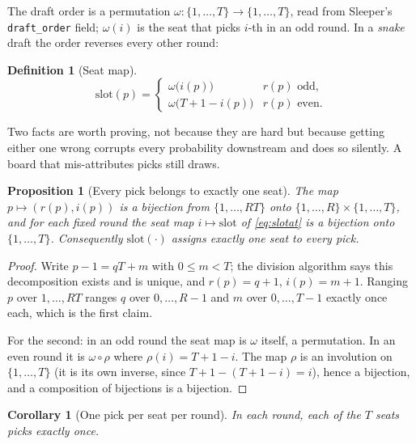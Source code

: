 \documentclass[10pt,a4paper]{article}
\theoremstyle{plain}
\newtheorem{proposition}[theorem]{Proposition}
\newtheorem{corollary}[theorem]{Corollary}
\theoremstyle{definition}
\newtheorem{definition}[theorem]{Definition}
\theoremstyle{remark}
\newcommand{\code}[1]{\texttt{\small #1}}
\begin{document}
The draft order is a permutation $\omega : \{1,\dots,T\} \to \{1,\dots,T\}$, read from
Sleeper's \code{draft\_order} field; $\omega(i)$ is the seat that picks $i$-th in an odd
round. In a \emph{snake} draft the order reverses every other round:

\begin{definition}[Seat map]
\begin{equation}
\mathrm{slot}(p) =
\begin{cases}
\omega\big(i(p)\big)      & r(p) \text{ odd},\\[0.2em]
\omega\big(T + 1 - i(p)\big) & r(p) \text{ even}.
\end{cases}
\label{eq:slotat}
\end{equation}
\end{definition}

Two facts are worth proving, not because they are hard but because getting either one
wrong corrupts every probability downstream and does so silently. A board that
mis-attributes picks still draws.

\begin{proposition}[Every pick belongs to exactly one seat]
\label{prop:bijection}
The map $p \mapsto (r(p), i(p))$ is a bijection from $\{1,\dots,RT\}$ onto
$\{1,\dots,R\} \times \{1,\dots,T\}$, and for each fixed round the seat map
$i \mapsto \mathrm{slot}$ of \eqref{eq:slotat} is a bijection onto $\{1,\dots,T\}$.
Consequently $\mathrm{slot}(\cdot)$ assigns exactly one seat to every pick.
\end{proposition}

\begin{proof}
Write $p - 1 = qT + m$ with $0 \le m < T$; the division algorithm says this
decomposition exists and is unique, and $r(p) = q+1$, $i(p) = m+1$. Ranging $p$ over
$1,\dots,RT$ ranges $q$ over $0,\dots,R-1$ and $m$ over $0,\dots,T-1$ exactly once
each, which is the first claim.

For the second: in an odd round the seat map is $\omega$ itself, a permutation. In an
even round it is $\omega \circ \rho$ where $\rho(i) = T+1-i$. The map $\rho$ is an
involution on $\{1,\dots,T\}$ (it is its own inverse, since $T+1-(T+1-i) = i$), hence a
bijection, and a composition of bijections is a bijection.
\end{proof}

\begin{corollary}[One pick per seat per round]
\label{cor:oneper}
In each round, each of the $T$ seats picks exactly once.
\end{corollary}
\end{document}

